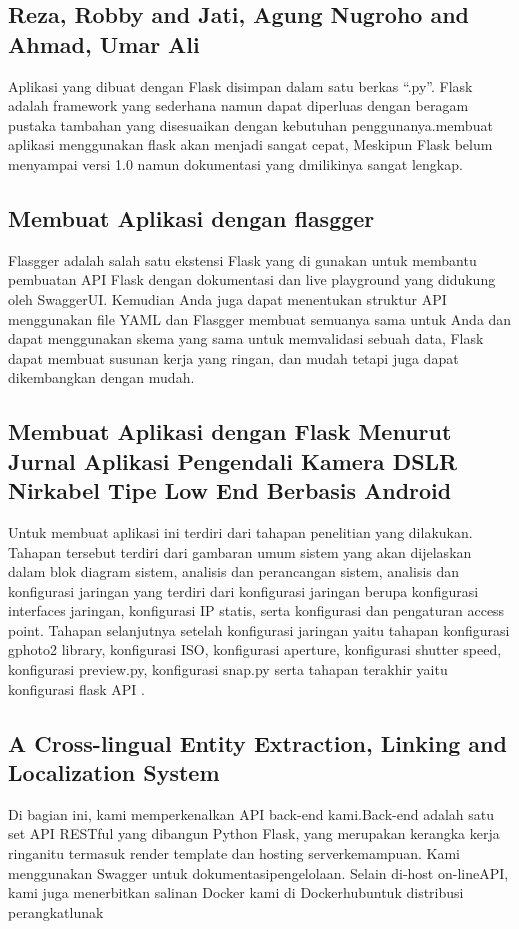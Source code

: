 \documentclass[12pt]{article}
\begin{document}
\subsection{Reza, Robby and Jati, Agung Nugroho and Ahmad, Umar Ali}
Aplikasi yang dibuat dengan Flask disimpan dalam satu berkas “.py”. Flask adalah framework yang sederhana namun dapat diperluas dengan beragam pustaka tambahan yang disesuaikan dengan kebutuhan penggunanya.membuat aplikasi menggunakan flask akan menjadi sangat cepat, Meskipun Flask belum menyampai versi 1.0 namun dokumentasi yang dmilikinya sangat lengkap\cite{reza2016perancangan}. 

\subsection{Membuat Aplikasi dengan flasgger}
Flasgger adalah salah satu ekstensi Flask yang di gunakan untuk membantu pembuatan API Flask dengan dokumentasi dan live playground yang didukung oleh SwaggerUI. Kemudian Anda juga dapat menentukan struktur API menggunakan file YAML dan Flasgger membuat semuanya sama untuk Anda dan dapat menggunakan skema yang sama untuk memvalidasi sebuah data, Flask dapat membuat susunan kerja yang ringan, dan mudah tetapi juga dapat dikembangkan dengan mudah\cite{gunawan2018aplikasi}.

\subsection{Membuat Aplikasi dengan Flask Menurut Jurnal Aplikasi Pengendali Kamera DSLR Nirkabel Tipe Low End Berbasis Android}
Untuk membuat aplikasi ini terdiri dari tahapan penelitian yang dilakukan. Tahapan tersebut terdiri dari gambaran umum sistem yang akan dijelaskan dalam blok diagram sistem, analisis dan perancangan sistem, analisis dan konfigurasi jaringan yang terdiri dari konfigurasi jaringan berupa konfigurasi interfaces jaringan, konfigurasi IP statis, serta konfigurasi dan pengaturan access point. Tahapan selanjutnya setelah konfigurasi jaringan yaitu tahapan konfigurasi gphoto2 library, konfigurasi ISO, konfigurasi aperture, konfigurasi shutter speed, konfigurasi preview.py, konfigurasi snap.py serta tahapan terakhir yaitu konfigurasi flask API \cite{computingaplikasi}.


\subsection{A Cross-lingual Entity Extraction, Linking and Localization System}
Di bagian ini, kami memperkenalkan API back-end kami.Back-end adalah satu set API RESTful yang dibangun Python Flask, yang merupakan kerangka kerja ringanitu termasuk render template dan hosting serverkemampuan. Kami menggunakan Swagger untuk dokumentasipengelolaan. Selain di-host on-lineAPI, kami juga menerbitkan salinan Docker kami di Dockerhubuntuk distribusi perangkatlunak
\end{document}

